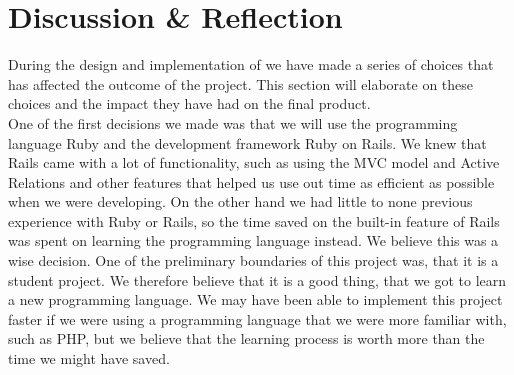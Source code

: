 













\section{Discussion \& Reflection}
During the design and implementation of \projectname{} we have made a series of choices that has affected the outcome of the project.
This section will elaborate on these choices and the impact they have had on the final product. \\

One of the first decisions we made was that we will use the programming language Ruby and the development framework Ruby on Rails. 
We knew that Rails came with a lot of functionality, such as using the MVC model and Active Relations and other features that helped us use out time as efficient as possible when we were developing. 
On the other hand we had little to none previous experience with Ruby or Rails, so the time saved on the built-in feature of Rails was spent on learning the programming language instead.
We believe this was a wise decision. 
One of the preliminary boundaries of this project was, that it is a student project. 
We therefore believe that it is a good thing, that we got to learn a new programming language. 
We may have been able to implement this project faster if we were using a programming language that we were more familiar with, such as PHP, but we believe that the learning process is worth more than the time we might have saved. \\

